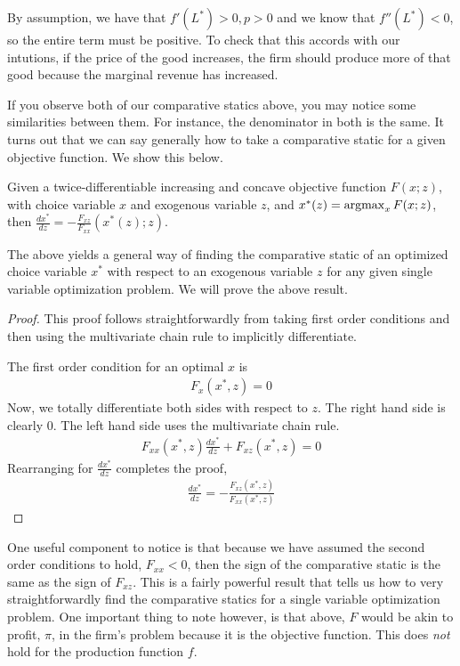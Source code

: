 \begin{description}
    By assumption, we have that $f'(L^*) > 0, p > 0$ and we know that $f''(L^*) < 0$, so the entire term must be positive. To check that this accords with our intutions, if the price of the good increases, the firm should produce more of that good because the marginal revenue has increased. 
\end{description}

If you observe both of our comparative statics above, you may notice some similarities between them. For instance, the denominator in both is the same. It turns out that we can say generally how to take a comparative static for a given objective function. We show this below.

\begin{proposition*}
    Given a twice-differentiable increasing and concave objective function $F(x; z)$, with choice variable $x$ and exogenous variable $z$, and $x^*(z) = \operatorname*{arg max}_{x} F(x; z)$, then $\frac{dx^*}{dz} = - \frac{F_{xz}}{F_{xx}}(x^*(z); z)$. 
\end{proposition*}

The above yields a general way of finding the comparative static of an optimized choice variable $x^*$ with respect to an exogenous variable $z$ for any given single variable optimization problem. We will prove the above result.

\begin{proof}
    This proof follows straightforwardly from taking first order conditions and then using the multivariate chain rule to implicitly differentiate. 

    The first order condition for an optimal $x$ is
    \begin{align*}
        F_x(x^*, z) = 0
    \end{align*}
    Now, we totally differentiate both sides with respect to $z$. The right hand side is clearly 0. The left hand side uses the multivariate chain rule.
    \begin{align*}
        F_{xx}(x^*, z) \frac{dx^*}{dz} + F_{xz}(x^*, z) = 0
    \end{align*}
    Rearranging for $\frac{dx^*}{dz}$ completes the proof,
    \begin{align*}
        \frac{dx^*}{dz} = -\frac{F_{xz}(x^*, z)}{F_{xx}(x^*, z)}
    \end{align*}
\end{proof}

One useful component to notice is that because we have assumed the second order conditions to hold, $F_{xx} < 0$, then the sign of the comparative static is the same as the sign of $F_{xz}$. This is a fairly powerful result that tells us how to very straightforwardly find the comparative statics for a single variable optimization problem. One important thing to note however, is that above, $F$ would be akin to profit, $\pi$, in the firm's problem because it is the objective function. This does \emph{not} hold for the production function $f$. 

